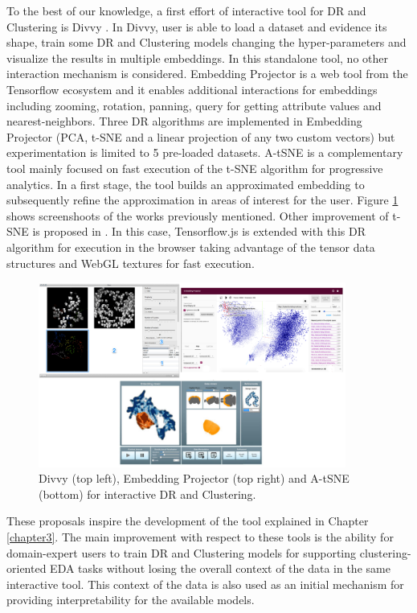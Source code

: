 To the best of our knowledge, a first effort of interactive tool for DR and Clustering is Divvy \cite{Lewis2013Divvy:Analysis}. In Divvy, user is able to load a dataset and evidence its shape, train some DR and Clustering models changing the hyper-parameters and visualize the results in multiple embeddings. In this standalone tool, no other interaction mechanism is considered. Embedding Projector \cite{Smilkov2016EmbeddingEmbeddings} is a web tool from the Tensorflow \cite{Abadi2016TensorFlow:Learning} ecosystem and it enables additional interactions for embeddings including zooming, rotation, panning, query for getting attribute values and nearest-neighbors. Three DR algorithms are implemented in Embedding Projector (PCA, t-SNE and a linear projection of any two custom vectors) but experimentation is limited to 5 pre-loaded datasets. A-tSNE \cite{Pezzotti2016ApproximatedAnalytics} is a complementary tool mainly focused on fast execution of the t-SNE algorithm for progressive analytics. In a first stage, the tool builds an approximated embedding to subsequently refine the approximation in areas of interest for the user. Figure \ref{fig:interactiveDR} shows screenshoots of the works previously mentioned. Other improvement of t-SNE is proposed in \cite{Pezzotti2018LinearWeb}. In this case, Tensorflow.js \cite{Smilkov2019TensorFlow.js:Beyond} is extended with this DR algorithm for execution in the browser taking advantage of the tensor data structures and WebGL textures for fast execution.

\begin{figure}[ht]
 \centering
 \includegraphics[width=0.9\textwidth]{InteractiveDR.png}
 \caption{Divvy \cite{Lewis2013Divvy:Analysis} (top left), Embedding Projector \cite{Smilkov2016EmbeddingEmbeddings} (top right) and A-tSNE \cite{Pezzotti2016ApproximatedAnalytics} (bottom) for interactive DR and Clustering.}
 \label{fig:interactiveDR}
\end{figure}

These proposals inspire the development of the tool explained in Chapter \ref{chapter3}. The main improvement with respect to these tools is the ability for domain-expert users to train DR and Clustering models for supporting clustering-oriented EDA tasks without losing the overall context of the data in the same interactive tool. This context of the data is also used as an initial mechanism for providing interpretability for the available models.
